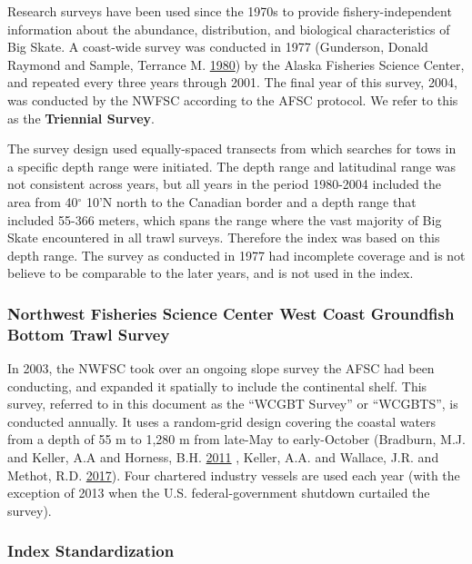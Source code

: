 \documentclass[12pt,]{article}
\begin{document}
Research surveys have been used since the 1970s to provide
fishery-independent information about the abundance, distribution, and
biological characteristics of Big Skate. A coast-wide survey was
conducted in 1977 (Gunderson, Donald Raymond and Sample, Terrance M.
\protect\hyperlink{ref-Gunderson1980}{1980}) by the Alaska Fisheries
Science Center, and repeated every three years through 2001. The final
year of this survey, 2004, was conducted by the NWFSC according to the
AFSC protocol. We refer to this as the \textbf{Triennial Survey}.

The survey design used equally-spaced transects from which searches for
tows in a specific depth range were initiated. The depth range and
latitudinal range was not consistent across years, but all years in the
period 1980-2004 included the area from 40\(^\circ\) 10'N north to the
Canadian border and a depth range that included 55-366 meters, which
spans the range where the vast majority of Big Skate encountered in all
trawl surveys. Therefore the index was based on this depth range. The
survey as conducted in 1977 had incomplete coverage and is not believe
to be comparable to the later years, and is not used in the index.

\hypertarget{northwest-fisheries-science-center-west-coast-groundfish-bottom-trawl-survey}{%
\subsubsection{Northwest Fisheries Science Center West Coast Groundfish
Bottom Trawl
Survey}\label{northwest-fisheries-science-center-west-coast-groundfish-bottom-trawl-survey}}

In 2003, the NWFSC took over an ongoing slope survey the AFSC had been
conducting, and expanded it spatially to include the continental shelf.
This survey, referred to in this document as the ``WCGBT Survey'' or
``WCGBTS'', is conducted annually. It uses a random-grid design covering
the coastal waters from a depth of 55 m to 1,280 m from late-May to
early-October (Bradburn, M.J. and Keller, A.A and Horness, B.H.
\protect\hyperlink{ref-Bradburn2011}{2011} , Keller, A.A. and Wallace,
J.R. and Methot, R.D. \protect\hyperlink{ref-Keller2017}{2017}). Four
chartered industry vessels are used each year (with the exception of
2013 when the U.S. federal-government shutdown curtailed the survey).

\hypertarget{index-standardization}{%
\subsubsection{Index Standardization}\label{index-standardization}}
\end{document}
